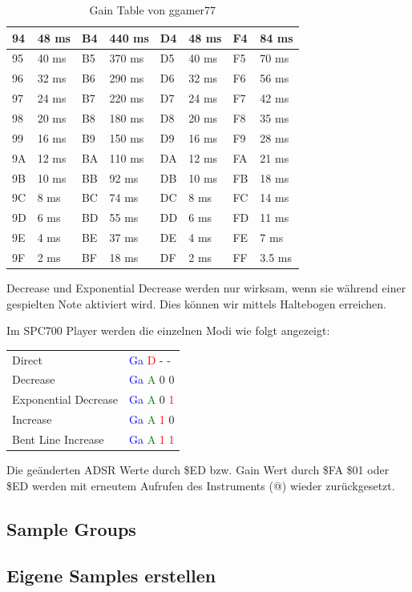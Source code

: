 \begin{table}[htbp]
\begin{tabularx}{\textwidth}{|l|X|l|X|l|X|l|X|}
	\hline
	94 & 48 ms & B4 & 440 ms & D4 & 48 ms & F4 & 84 ms \\
	\hline
	95 & 40 ms & B5 & 370 ms & D5 & 40 ms & F5 & 70 ms \\
	\hline
	96 & 32 ms & B6 & 290 ms & D6 & 32 ms & F6 & 56 ms \\
	\hline
	97 & 24 ms & B7 & 220 ms & D7 & 24 ms & F7 & 42 ms \\
	\hline
	98 & 20 ms & B8 & 180 ms & D8 & 20 ms & F8 & 35 ms \\
	\hline
	99 & 16 ms & B9 & 150 ms & D9 & 16 ms & F9 & 28 ms \\
	\hline
	9A & 12 ms & BA & 110 ms & DA & 12 ms & FA & 21 ms \\
	\hline
	9B & 10 ms & BB & 92 ms & DB & 10 ms & FB & 18 ms \\
	\hline
	9C & 8 ms & BC & 74 ms & DC & 8 ms & FC & 14 ms \\
	\hline
	9D & 6 ms & BD & 55 ms & DD & 6 ms & FD & 11 ms \\
	\hline
	9E & 4 ms & BE & 37 ms & DE & 4 ms & FE & 7 ms \\
	\hline
	9F & 2 ms & BF & 18 ms & DF & 2 ms & FF & 3.5 ms \\
	\hline
\end{tabularx}
\caption{Gain Table von ggamer77}
\end{table}

\medskip

Decrease und Exponential Decrease werden nur wirksam, wenn sie während einer gespielten Note aktiviert wird. Dies können wir mittels Haltebogen erreichen.

\bigskip

Im SPC700 Player werden die einzelnen Modi wie folgt angezeigt: 

\bigskip

\begin{tabularx}{\textwidth}{l l}
Direct & 
\textcolor{blue}{Ga}
\textcolor{red}{D}
- -
\\
Decrease & 
\textcolor{blue}{Ga}
\textcolor{green}{A}
0 0
\\
Exponential Decrease & 
\textcolor{blue}{Ga}
\textcolor{green}{A}
0
\textcolor{red}{1}
\\
Increase &
\textcolor{blue}{Ga}
\textcolor{green}{A}
\textcolor{red}{1}
0
\\
Bent Line Increase &
\textcolor{blue}{Ga}
\textcolor{green}{A}
\textcolor{red}{1}
\textcolor{red}{1}
\end{tabularx}

\bigskip

Die geänderten ADSR Werte durch \$ED bzw. Gain Wert durch \$FA \$01 oder \$ED werden mit erneutem Aufrufen des Instruments (@) wieder zurückgesetzt.

\subsection{Sample Groups}
\subsection{Eigene Samples erstellen}
